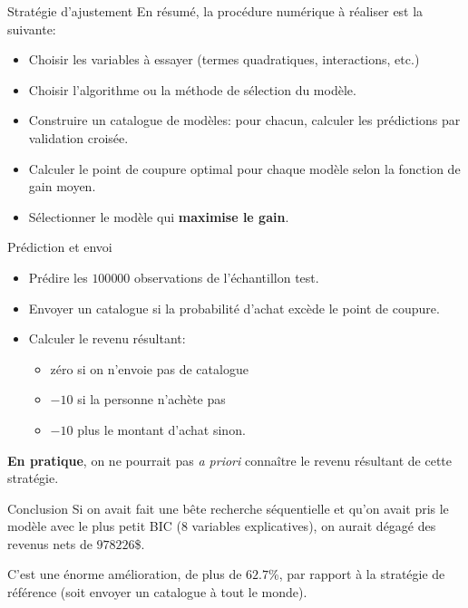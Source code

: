 \documentclass[
  ignorenonframetext,
]{beamer}
\providecommand{\tightlist}{%
  \setlength{\itemsep}{0pt}\setlength{\parskip}{0pt}}\usepackage{longtable,booktabs,array}
\begin{document}
\begin{frame}{Stratégie d'ajustement}
\label{stratuxe9gie-dajustement}
En résumé, la procédure numérique à réaliser est la suivante:

\begin{itemize}
\tightlist
\item
  Choisir les variables à essayer (termes quadratiques, interactions,
  etc.)
\item
  Choisir l'algorithme ou la méthode de sélection du modèle.
\item
  Construire un catalogue de modèles: pour chacun, calculer les
  prédictions par validation croisée.
\item
  Calculer le point de coupure optimal pour chaque modèle selon la
  fonction de gain moyen.
\item
  Sélectionner le modèle qui \textbf{maximise le gain}.
\end{itemize}
\end{frame}

\begin{frame}{Prédiction et envoi}
\label{pruxe9diction-et-envoi}
\begin{itemize}
\tightlist
\item
  Prédire les \(100 000\) observations de l'échantillon test.
\item
  Envoyer un catalogue si la probabilité d'achat excède le point de
  coupure.
\item
  Calculer le revenu résultant:

  \begin{itemize}
  \tightlist
  \item
    zéro si on n'envoie pas de catalogue
  \item
    \(-10\) si la personne n'achète pas
  \item
    \(-10\) plus le montant d'achat sinon.
  \end{itemize}
\end{itemize}

\textbf{En pratique}, on ne pourrait pas \emph{a priori} connaître le
revenu résultant de cette stratégie.
\end{frame}

\begin{frame}{Conclusion}
\label{conclusion}
Si on avait fait une bête recherche séquentielle et qu'on avait pris le
modèle avec le plus petit BIC (8 variables explicatives), on aurait
dégagé des revenus nets de \(978 226\)\$.

C'est une énorme amélioration, de plus de \(62.7\)\%, par rapport à la
stratégie de référence (soit envoyer un catalogue à tout le monde).
\end{frame}
\end{document}
